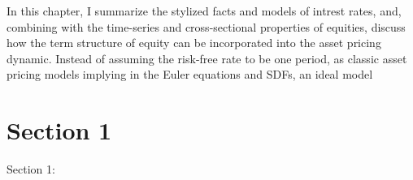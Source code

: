 \minitoc

\vspace{0.5cm}

In this chapter, I summarize the stylized facts and models of intrest rates, 
and, combining with the time-series and cross-sectional properties of equities, 
discuss how the term structure of equity can be incorporated into the asset pricing
dynamic. Instead of assuming the risk-free rate to be one period, as classic 
asset pricing models implying in the Euler equations and SDFs, an ideal model 

\section{Section 1}
Section 1: